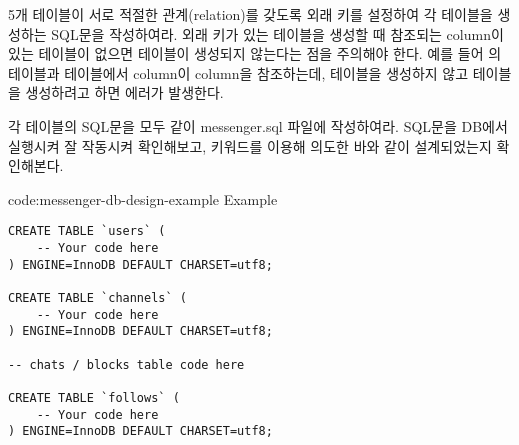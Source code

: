5개 테이블이 서로 적절한 관계(relation)를 갖도록 외래 키를 설정하여 각 테이블을 생성하는 SQL문을 작성하여라. 외래 키가 있는 테이블을 생성할 때 참조되는 column이 있는 테이블이 없으면 테이블이 생성되지 않는다는 점을 주의해야 한다. 예를 들어 의  테이블과  테이블에서  column이  column을 참조하는데,  테이블을 생성하지 않고  테이블을 생성하려고 하면 에러가 발생한다.

각 테이블의 SQL문을 모두 \과 같이 messenger.sql 파일에 작성하여라. SQL문을 DB에서 실행시켜 잘 작동시켜 확인해보고,  키워드를 이용해 의도한 바와 같이 설계되었는지 확인해본다.

\begin{code}{code:messenger-db-design-example}{ Example}
\begin{verbatim}
CREATE TABLE `users` (
    -- Your code here
) ENGINE=InnoDB DEFAULT CHARSET=utf8;

CREATE TABLE `channels` (
    -- Your code here
) ENGINE=InnoDB DEFAULT CHARSET=utf8;

-- chats / blocks table code here

CREATE TABLE `follows` (
    -- Your code here
) ENGINE=InnoDB DEFAULT CHARSET=utf8;
\end{verbatim}
\end{code}
